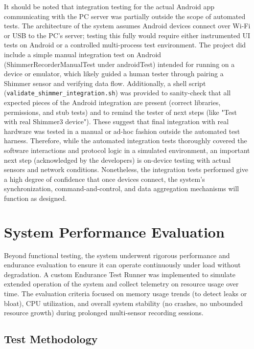 \documentclass[11pt,a4paper]{report}
\begin{document}
It should be noted that integration testing for the actual Android app communicating with the PC server was partially outside the scope of automated tests. The architecture of the system assumes Android devices connect over Wi-Fi or USB to the PC's server; testing this fully would require either instrumented UI tests on Android or a controlled multi-process test environment. The project did include a simple manual integration test on Android (ShimmerRecorderManualTest under androidTest) intended for running on a device or emulator, which likely guided a human tester through pairing a Shimmer sensor and verifying data flow. Additionally, a shell script (\texttt{validate\_shimmer\_integration.sh}) was provided to sanity-check that all expected pieces of the Android integration are present (correct libraries, permissions, and stub tests) and to remind the tester of next steps (like "Test with real Shimmer3 device"). These suggest that final integration with real hardware was tested in a manual or ad-hoc fashion outside the automated test harness. Therefore, while the automated integration tests thoroughly covered the software interactions and protocol logic in a simulated environment, an important next step (acknowledged by the developers) is on-device testing with actual sensors and network conditions. Nonetheless, the integration tests performed give a high degree of confidence that once devices connect, the system's synchronization, command-and-control, and data aggregation mechanisms will function as designed.

\section{System Performance Evaluation}

Beyond functional testing, the system underwent rigorous performance and endurance evaluation to ensure it can operate continuously under load without degradation. A custom Endurance Test Runner was implemented to simulate extended operation of the system and collect telemetry on resource usage over time. The evaluation criteria focused on memory usage trends (to detect leaks or bloat), CPU utilization, and overall system stability (no crashes, no unbounded resource growth) during prolonged multi-sensor recording sessions.

\subsection{Test Methodology}
\end{document}
